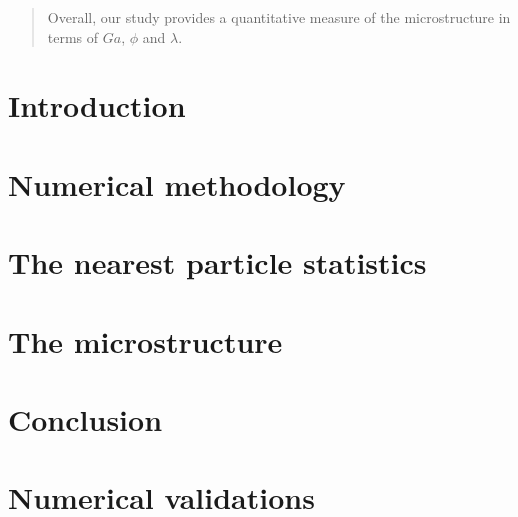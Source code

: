 \documentclass[11pt]{My_preprint}
\begin{document}
\begin{abstract}
    Overall, our study provides a quantitative measure of the microstructure 
     in terms of $Ga$, $\phi$ and $\lambda$. 
\end{abstract}

\section{Introduction}


\section{Numerical methodology}
\label{sec:methodo}





\section{The nearest particle statistics}
\label{sec:nearest}


\section{The microstructure}
\label{sec:microstructure}



\section{Conclusion}
\label{sec:conclusion}


\appendix



\section{Numerical validations}
\label{ap:validation}




\end{document}

